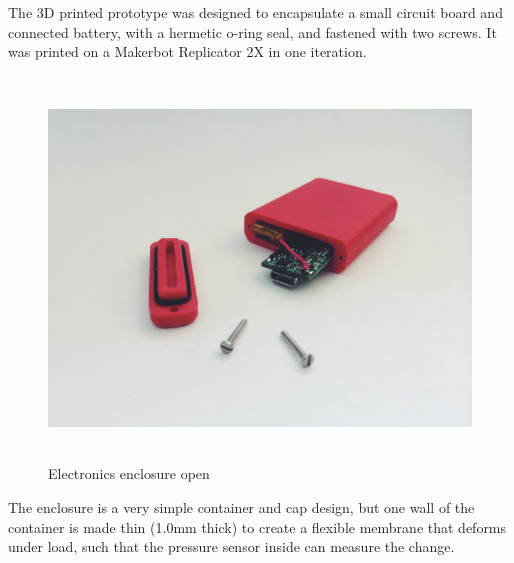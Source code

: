 \documentclass[12pt, landscape]{article}
\begin{document}
	The 3D printed prototype was designed to encapsulate a small circuit board and connected battery, with a hermetic o-ring seal, and fastened with two screws.  It was printed on a Makerbot Replicator 2X in one iteration.

	\begin{figure}[H]
		\centering
		\includegraphics[height=4in]{media/enclosure_open}
		\caption{Electronics enclosure open}
		\label{enclosure_open}
	\end{figure}

	The enclosure is a very simple container and cap design, but one wall of the container is made thin (1.0mm thick) to create a flexible membrane that deforms under load, such that the pressure sensor inside can measure the change.
\end{document}
